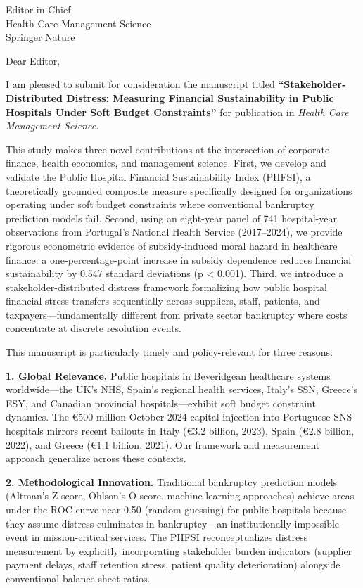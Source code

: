 \documentclass[11pt]{letter}
\begin{document}
\begin{letter}{
Editor-in-Chief \\
Health Care Management Science \\
Springer Nature
}

\opening{Dear Editor,}

I am pleased to submit for consideration the manuscript titled \textbf{``Stakeholder-Distributed Distress: Measuring Financial Sustainability in Public Hospitals Under Soft Budget Constraints''} for publication in \textit{Health Care Management Science}.

This study makes three novel contributions at the intersection of corporate finance, health economics, and management science. First, we develop and validate the Public Hospital Financial Sustainability Index (PHFSI), a theoretically grounded composite measure specifically designed for organizations operating under soft budget constraints where conventional bankruptcy prediction models fail. Second, using an eight-year panel of 741 hospital-year observations from Portugal's National Health Service (2017--2024), we provide rigorous econometric evidence of subsidy-induced moral hazard in healthcare finance: a one-percentage-point increase in subsidy dependence reduces financial sustainability by 0.547 standard deviations (p < 0.001). Third, we introduce a stakeholder-distributed distress framework formalizing how public hospital financial stress transfers sequentially across suppliers, staff, patients, and taxpayers---fundamentally different from private sector bankruptcy where costs concentrate at discrete resolution events.

This manuscript is particularly timely and policy-relevant for three reasons:

\textbf{1. Global Relevance.} Public hospitals in Beveridgean healthcare systems worldwide---the UK's NHS, Spain's regional health services, Italy's SSN, Greece's ESY, and Canadian provincial hospitals---exhibit soft budget constraint dynamics. The €500 million October 2024 capital injection into Portuguese SNS hospitals mirrors recent bailouts in Italy (€3.2 billion, 2023), Spain (€2.8 billion, 2022), and Greece (€1.1 billion, 2021). Our framework and measurement approach generalize across these contexts.

\textbf{2. Methodological Innovation.} Traditional bankruptcy prediction models (Altman's Z-score, Ohlson's O-score, machine learning approaches) achieve areas under the ROC curve near 0.50 (random guessing) for public hospitals because they assume distress culminates in bankruptcy---an institutionally impossible event in mission-critical services. The PHFSI reconceptualizes distress measurement by explicitly incorporating stakeholder burden indicators (supplier payment delays, staff retention stress, patient quality deterioration) alongside conventional balance sheet ratios.


\end{letter}
\end{document}
